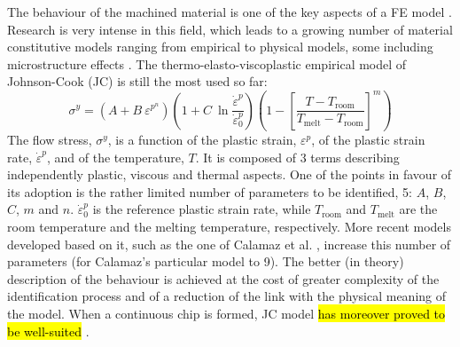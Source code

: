 \documentclass[preprint,12pt,times]{elsarticle}
\begin{document}
The behaviour of the machined material is one of the key aspects of a FE model \cite{arrazola_Recent_2013, melkote_Advances_2017}. Research is very intense in this field, which leads to a growing number of material constitutive models ranging from empirical to physical models, some including microstructure effects \cite{melkote_Advances_2017}. The thermo-elasto-viscoplastic empirical model of Johnson-Cook (JC) \cite{johnson_Constitutive_1983} is still the most used so far:
%
\begin{equation}\label{eq:J-C}
	\sigma^{y} = \left(A + B\ \varepsilon^{p^n} \right) \left(1 + C\ \ln\frac{{\dot{\varepsilon}}^p}{\dot{\varepsilon}_{0}^{p}}\right) \left(1 - \left[\frac{T - T_{\text{room}}}{T_{\text{melt}} - T_{\text{room}}}\right]^{m}\right)
\end{equation}
%
The flow stress, $\sigma^{y}$, is a function of the plastic strain, $\varepsilon^{p}$, of the plastic strain rate, ${\dot{\varepsilon}}^{p}$, and of the temperature, $T$. It is composed of 3 terms describing independently plastic, viscous and thermal aspects. One of the points in favour of its adoption is the rather limited number of parameters to be identified, 5: $A$, $B$, $C$, $m$ and $n$. $\dot{\varepsilon}_{0}^{p}$ is the reference plastic strain rate, while $T_{\text{room}}$ and $T_{\text{melt}}$ are the room temperature and the melting temperature, respectively. More recent models developed based on it, such as the one of Calamaz et al. \cite{calamaz_New_2008}, increase this number of parameters (for Calamaz's particular model to 9). The better (in theory) description of the behaviour is achieved at the cost of greater complexity of the identification process and of a reduction of the link with the physical meaning of the model. When a continuous chip is formed, JC model \hl{has moreover proved to be well-suited} \cite{}.
\end{document}

